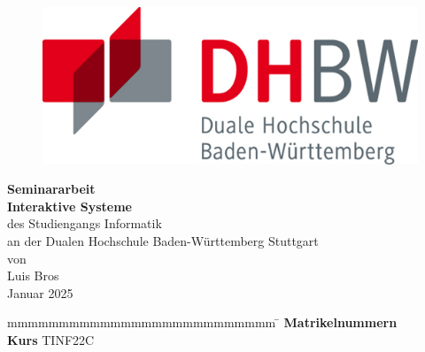 \begin{titlepage}

    \begin{figure}

        \centering
        \begin{minipage}[t]{0.45\linewidth}
            \centering
            \includegraphics[width=.75\linewidth]{resources/DHBW}
        \end{minipage}

    \end{figure}

    \begin{center}
        \vspace*{12mm} {\LARGE\textbf{Seminararbeit}} \\
        \vspace*{12mm} {\large\textbf{Interaktive Systeme}} \\
        \vspace*{12mm} {des Studiengangs Informatik} \\
        \vspace*{3mm} {an der Dualen Hochschule Baden-Württemberg Stuttgart} \\
        \vspace*{12mm} {von} \\
        \vspace*{3mm} {Luis Bros} \\
        \vspace*{12mm} {Januar 2025}\\
    \end{center}

    \vfill
    \begin{spacing}{1.2}
        \begin{tabbing}
            mmmmmmmmmmmmmmmmmmmmmmmmmm              \= \kill
            \textbf{Matrikelnummern}                 \\
            \textbf{Kurs}                           \> TINF22C \\
        \end{tabbing}
    \end{spacing}

    \newpage

\end{titlepage}

\pagestyle{headings}